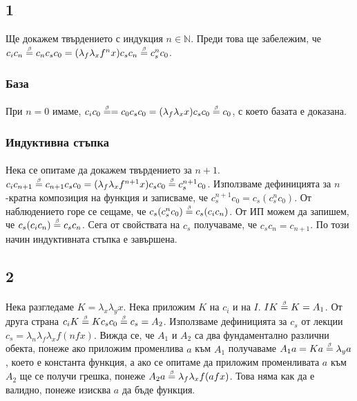 \documentclass[12pt]{article}
\begin{document}
\subsection*{1}
Ще докажем твърдението с индукция $n \in \mathbb{N}$. Преди това ще забележим, че $c_i c_n \betaeq c_n c_s c_0 = (\lambda_f \lambda_x f^n x) c_s c_n \betaeq c_s^n c_0 $.
\subsubsection*{База}
\paragraph*{}
При $n=0$ имаме, $c_i c_0 \betaeq = c_0 c_s c_0 = (\lambda_f \lambda_x x) c_s c_0 \betaeq c_0$, с което базата е доказана.

\subsubsection*{Индуктивна стъпка}
\paragraph*{}
Нека се опитаме да докажем твърдението за $n+1$. $c_i c_{n+1} \betaeq c_{n+1} c_s c_0 = (\lambda_f \lambda_x f^{n+1} x) c_s c_0 \betaeq c_s^{n+1} c_0$. Използваме дефиницията за $n$-кратна композиция на функция и записваме, че $c_s^{n+1} c_0 = c_s (c_s^n c_0)$. От наблюдението горе се сещаме, че $c_s (c_s^n c_0) \betaeq c_s (c_i c_n)$. От ИП можем да запишем, че $c_s (c_i c_n) \betaeq c_s c_n$. Сега от свойствата на $c_s$ получаваме, че $c_s c_n = c_{n+1}$. По този начин индуктивната стъпка е завършена.


\subsection*{2}
\paragraph*{}
Нека разгледаме $K = \lambda_x \lambda_y x$. Нека приложим $K$ на $c_i$ и на $I$. $I K \betaeq K = A_1$. От друга страна $c_i K \betaeq K c_s c_0 \betaeq c_s = A_2$. Използваме дефиницията за $c_s$ от лекции $c_s = \lambda_n \lambda_f \lambda_x f (n f x)$. Вижда се, че $A_1$ и $A_2$ са два фундаментално различни обекта, понеже ако приложим променлива $a$ към $A_1$ получаваме $A_1 a = Ka \betaeq \lambda_y a$, което е константа функция, а ако се опитаме да приложим променливата $a$ към $A_2$ ще се получи грешка, понеже $A_2 a \betaeq \lambda_f \lambda_x f(afx)$. Това няма как да е валидно, понеже изисква $a$ да бъде функция.
\end{document}
